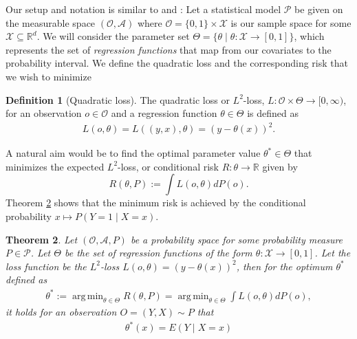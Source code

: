 \documentclass[11pt, a4paper]{article}
\DeclareMathOperator*{\argmin}{arg\,min}
\newtheorem{theorem}{Theorem}
\theoremstyle{definition}
\newtheorem{definition}[theorem]{Definition}
\theoremstyle{remark}
\newcommand{\btheta}{\theta}
\begin{document}
Our setup and notation is similar to \cite{vaart06} and \cite{laan03}:
Let a statistical model $ \mathcal{P} $ be given on the measurable space $ (\mathcal{O}, \mathcal{A}) $ where $ \mathcal{O} = \{0,1\} \times \mathcal{X} $ is our sample space for some $ \mathcal{X} \subseteq \mathbb{R}^{d} $. 
We will consider the parameter set $ \Theta = \{\btheta \mid \btheta : \mathcal{X} \to [0,1]\} $, which represents the set of \textit{regression functions} that map from our covariates to the probability interval. We define the quadratic loss and the corresponding risk that we wish to minimize 
\begin{definition}[Quadratic loss]
    The quadratic loss or $ L^2 $-loss, $ L : \mathcal{O} \times \Theta \to [0, \infty) $, for an observation $ o \in \mathcal{O} $ and a regression function $ \btheta \in \Theta $ is defined as 
\begin{align*}
    L(o, \btheta) = L((y,x), \btheta) = (y - \btheta(x))^2.
\end{align*}
\end{definition}
A natural aim would be to find the optimal parameter value $\btheta^* \in \Theta$ that minimizes the expected $L^2$-loss, or conditional risk $R: \btheta \to \mathbb{R}$ given by 
\begin{equation} \label{l2risk}
    R(\btheta, P) := \int L(o, \btheta)  dP(o).
\end{equation}
Theorem \ref{minrisk} shows that the minimum risk is achieved by the conditional probability $ x \mapsto P(Y = 1\mid X = x) $. 
\begin{theorem} \label{minrisk}
    Let $ (\mathcal{O} , \mathcal{A}, P) $ be a probability space for some probability measure $ P \in \mathcal{P} $. Let $ \Theta $ be the set of regression functions of the form $ \btheta : \mathcal{X} \to [0,1] $. Let the loss function be the $ L^2 $-loss $ L(o, \btheta) = (y - \btheta(x))^2 $, then for the optimum $ \btheta^* $ defined as 
    \begin{align*}
        \btheta^* := \argmin_{\btheta \in \Theta} R(\btheta, P)= \argmin_{\btheta \in \Theta} \int L(o, \btheta)  dP(o),
    \end{align*}
    it holds for an observation $ O = (Y, X) \sim P $ that
    \begin{align*}
        \btheta^{*}(x) = E(Y \mid X = x) 
    \end{align*}
\end{theorem}
\end{document}
